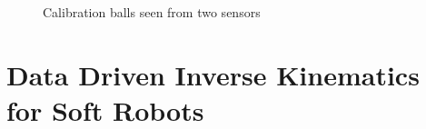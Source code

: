 \documentclass[letterpaper, 10 pt, conference]{ieeeconf}  %
\begin{document}
 \begin{figure}[htpb]
        \centering
        \caption{Calibration balls seen from two sensors}
        \label{fig:calib}
\end{figure}

\clearpage
   
\section{Data Driven Inverse Kinematics for Soft Robots}
\blindtext[2]
\end{document}
